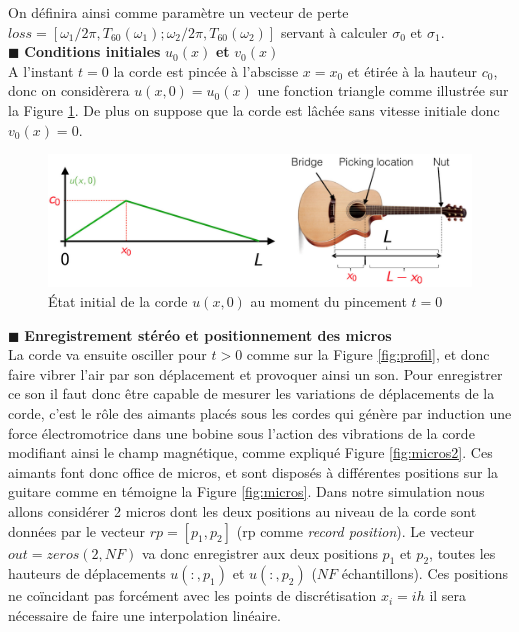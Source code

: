 \documentclass[a4,12pt]{article}
\begin{document}
On définira ainsi comme paramètre un vecteur de perte $loss=[\omega_1/2\pi,T_{60}(\omega_1) ; \omega_2/2\pi,T_{60}(\omega_2)]$ servant à calculer $\sigma_0$ et $\sigma_1$. \\

\hspace{0.5cm} $\blacksquare$ \textbf{Conditions initiales} $u_0(x)$ \textbf{et} $v_0(x)$\\

A l'instant $t=0$ la corde est pincée à l'abscisse $x=x_0$ et étirée à la hauteur $c_0$, donc on considèrera $u(x,0)=u_0(x)$ une fonction triangle comme illustrée sur la Figure \ref{fig:triangle}. De plus on suppose que la corde est lâchée sans vitesse initiale donc $v_0(x)=0$.\\

\begin{figure}
	\begin{center}
		\includegraphics[width=\textwidth]{images/triangle.pdf}
		\caption{\'Etat initial de la corde $u(x,0)$ au moment du pincement $t=0$}
		\label{fig:triangle}
	\end{center}
\end{figure}

\hspace{0.5cm} $\blacksquare$ \textbf{Enregistrement stéréo et positionnement des micros}\\

La corde va ensuite osciller pour $t>0$ comme sur la Figure \ref{fig:profil}, et donc faire vibrer l'air par son déplacement et provoquer ainsi un son. Pour enregistrer ce son il faut donc être capable de mesurer les variations de déplacements de la corde, c'est le rôle des aimants placés sous les cordes qui génère par induction une force électromotrice dans une bobine sous l'action des vibrations de la corde modifiant ainsi le champ magnétique, comme expliqué Figure \ref{fig:micros2}. Ces aimants font donc office de micros, et sont disposés à différentes positions sur la guitare comme en témoigne la Figure \ref{fig:micros}. Dans notre simulation nous allons considérer 2 micros dont les deux positions au niveau de la corde sont données par le vecteur $rp=[p_1,p_2]$ (rp comme \textit{record position}). Le vecteur $out=zeros(2,NF)$ va donc enregistrer aux deux positions $p_1$ et $p_2$, toutes les hauteurs de déplacements $u(:,p_1)$ et $u(:,p_2)$ ($NF$ échantillons). Ces positions ne coïncidant pas forcément avec les points de discrétisation $x_i=ih$ il sera nécessaire de faire une interpolation linéaire.
\end{document}
